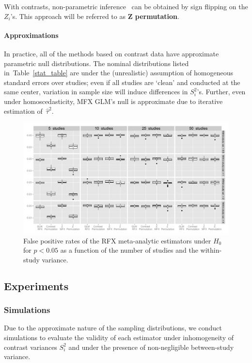 \documentclass{llncs}
\newcommand{\vareffect}[1][i]{S^2_{#1}}
\newcommand{\zeffect}[1][i]{Z_{#1}}
\newcommand{\estvarBetween}{\hat\tau^2}
\begin{document}
With contrasts, non-parametric inference~\cite{Holmes1996,Nichols2002} can be obtained by sign flipping on the $\zeffect$'s. This approach will be referred to as \textbf{Z permutation}.

\paragraph{Approximations}  In practice, all of the methods based on contrast data have approximate parametric null distributions.  The nominal distributions listed in~Table~\ref{stat_table} are under the (unrealistic) assumption of homogeneous standard errors over studies; even if all studies are `clean' and conducted at the same center, variation in sample size will induce differences in $\vareffect$'s.  Further, even under homoscedasticity, MFX GLM's null is approximate due to iterative estimation of~$\estvarBetween$.   

\begin{figure}[t]
	\centering
	\includegraphics[width=\linewidth]{./Rplot_valids.pdf}
	\caption{False positive rates of the RFX meta-analytic estimators under $H_0$ for $p<0.05$ as a function of the number of studies and the within-study variance.}
	\label{fig_fpr_valid}
\end{figure}

\subsection{Experiments}

\subsubsection{Simulations}
Due to the approximate nature of the sampling distributions, we conduct simulations to evaluate the validity of each estimator under inhomogeneity of contrast variances $\vareffect$ and under the presence of non-negligible between-study variance.
\end{document}
